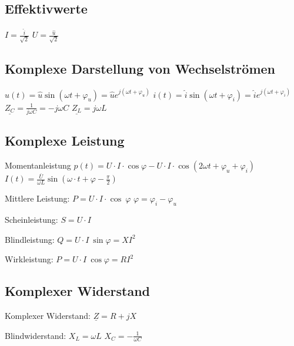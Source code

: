 \documentclass{article}
\begin{document}
	\subsection{Effektivwerte}
	$I=\frac{\hat{i}}{\sqrt{2}}$
	$U=\frac{\hat{u}}{\sqrt{2}}$
	
	\subsection{Komplexe Darstellung von Wechselströmen}
	$u(t)=\hat{u}\sin(\omega t+\varphi_{u})=\hat{u}e^{j(\omega t+\varphi_{u})}$
	$i(t)=\hat{i}\sin(\omega t+\varphi_{i})=\hat{i}e^{j(\omega t+\varphi_{i})}$
	$\underline{Z_{C}}=\frac{1}{j\omega C}=-j\omega C$
	$\underline{Z_{L}}=j\omega L$
	
	\subsection{Komplexe Leistung}
	
	Momentanleistung
	$p(t)=U\cdot I\cdot \cos\varphi-U\cdot I\cdot \cos(2\omega t+\varphi_{u}+\varphi_{i})$
	$I(t)=\frac{\overline{U}}{\omega L}\sin(\omega\cdot t+\varphi-\frac{\pi}{2})$
	
	Mittlere Leistung:
	$P=U\cdot I\cdot \cos~\varphi$
	$\varphi=\varphi_{i}-\varphi_{u}$
	
	Scheinleistung:
	$S=U\cdot I$
	
	Blindleistung:
	$Q=U\cdot I~\sin\varphi=XI^{2}$
	
	Wirkleistung:
	$P=U\cdot I~\cos\varphi=RI^{2}$
	
	\subsection{Komplexer Widerstand}
	
	Komplexer Widerstand:
	$\underline{Z}=R+jX$
	
	Blindwiderstand:
	$X_{L}=\omega L$
	$X_{C}=-\frac{1}{\omega C}$
	
\end{document}
